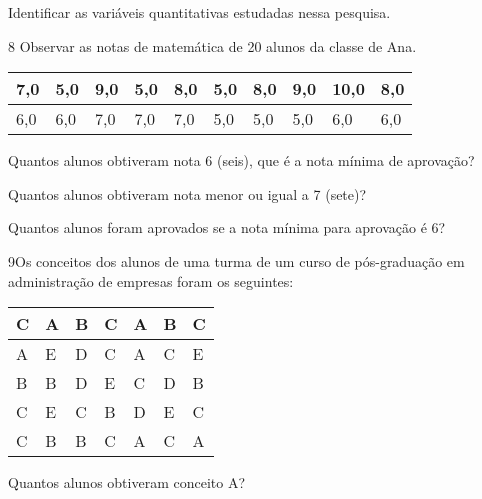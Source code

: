 {\begin{escolha}
\item
  Identificar as variáveis quantitativas estudadas nessa pesquisa.

\end{escolha}


\num{8} Observar as notas de matemática de 20 alunos da classe de Ana.

\begin{longtable}[]{@{}llllllllll@{}}
\toprule
7,0 & 5,0 & 9,0 & 5,0 & 8,0 & 5,0 & 8,0 & 9,0 & 10,0 &
8,0\tabularnewline
\midrule
\endhead
6,0 & 6,0 & 7,0 & 7,0 & 7,0 & 5,0 & 5,0 & 5,0 & 6,0 & 6,0\tabularnewline
\bottomrule
\end{longtable}

\begin{escolha}
\item
  Quantos alunos obtiveram nota 6 (seis), que é a nota mínima de aprovação?


\item
  Quantos alunos obtiveram nota menor ou igual a 7 (sete)?


\item
  Quantos alunos foram aprovados se a nota mínima para aprovação é 6?

\end{escolha}


\num{9}Os conceitos dos alunos de uma turma de um curso de pós-graduação
em administração de empresas foram os seguintes:

\begin{longtable}[]{@{}lllllll@{}}
\toprule
C & A & B & C & A & B & C\tabularnewline
\midrule
\endhead
A & E & D & C & A & C & E\tabularnewline
B & B & D & E & C & D & B\tabularnewline
C & E & C & B & D & E & C\tabularnewline
C & B & B & C & A & C & A\tabularnewline
\bottomrule
\end{longtable}

\begin{escolha}
\item
  Quantos alunos obtiveram conceito A?



\end{escolha}}
